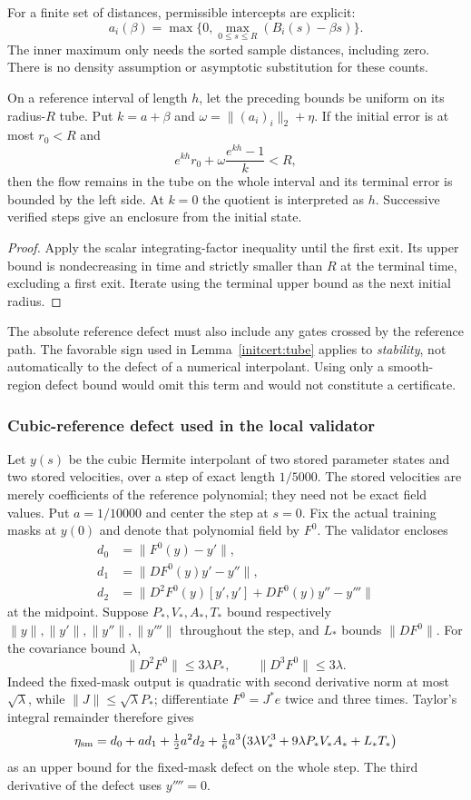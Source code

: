 For a finite set of distances, permissible intercepts are explicit:
\[
 a_i(\beta)=\max\big\{0,\max_{0\le s\le R}(B_i(s)-\beta s)\big\}.
\]
The inner maximum only needs the sorted sample distances, including zero.
There is no density assumption or asymptotic substitution for these counts.

\begin{corollary}\label{initcert:tube-step}
On a reference interval of length $h$, let the preceding bounds be uniform
on its radius-$R$ tube. Put $k=a+\beta$ and
$\omega=\|(a_i)_i\|_2+\eta$. If the initial error is at most $r_0<R$ and
\[
 e^{kh}r_0+\omega\frac{e^{kh}-1}{k}<R,
\]
then the flow remains in the tube on the whole interval and its terminal
error is bounded by the left side. At $k=0$ the quotient is interpreted as
$h$. Successive verified steps give an enclosure from the initial state.
\end{corollary}
\begin{proof}
Apply the scalar integrating-factor inequality until the first exit. Its
upper bound is nondecreasing in time and strictly smaller than $R$ at the
terminal time, excluding a first exit. Iterate using the terminal upper bound
as the next initial radius.
\end{proof}
The absolute reference defect must also include any gates crossed by the
reference path. The favorable sign used in Lemma~\ref{initcert:tube} applies to
\emph{stability}, not automatically to the defect of a numerical interpolant.
Using only a smooth-region defect bound would omit this term and would not
constitute a certificate.

\subsubsection{Cubic-reference defect used in the local validator}
Let $y(s)$ be the cubic Hermite interpolant of two stored parameter states
and two stored velocities, over a step of exact length $1/5000$.
The stored velocities are merely coefficients of the reference polynomial;
they need not be exact field values. Put $a=1/10000$ and center the step
at $s=0$. Fix the actual training masks at $y(0)$ and denote that polynomial
field by $F^0$. The validator encloses
\begin{align*}
 d_0&=\|F^0(y)-y'\|,\\
 d_1&=\|DF^0(y)y'-y''\|,\\
 d_2&=\|D^2F^0(y)[y',y']+DF^0(y)y''-y'''\|
\end{align*}
at the midpoint. Suppose $P_*,V_*,A_*,T_*$ bound respectively
$\|y\|,\|y'\|,\|y''\|,\|y'''\|$ throughout the step, and $L_*$
bounds $\|DF^0\|$. For the covariance bound $\lambda$,
\[
 \|D^2F^0\|\le3\lambda P_*,\qquad
 \|D^3F^0\|\le3\lambda.
\]
Indeed the fixed-mask output is quadratic with second derivative norm
at most $\sqrt\lambda$, while $\|J\|\le\sqrt\lambda P_*$;
differentiate $F^0=J^*e$ twice and three times.
Taylor's integral remainder therefore gives
\[
 \eta_{\rm sm}=d_0+ad_1+\tfrac12a^2d_2+
 \tfrac16a^3\big(3\lambda V_*^3+9\lambda P_*V_*A_*+L_*T_*\big)
\]
as an upper bound for the fixed-mask defect on the whole step.
The third derivative of the defect uses $y''''=0$.

